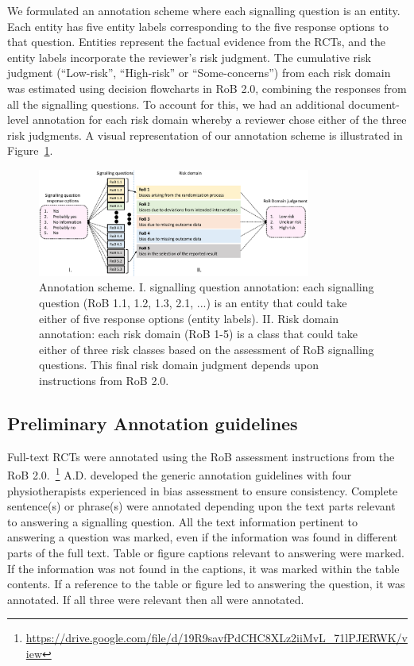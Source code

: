 \documentclass{IOS-Book-Article}
\begin{document}
We formulated an annotation scheme where each signalling question is an entity.
Each entity has five entity labels corresponding to the five response options to that question.
Entities represent the factual evidence from the RCTs, and the entity labels incorporate the reviewer's risk judgment.
The cumulative risk judgment (``Low-risk'', ``High-risk'' or ``Some-concerns'') from each risk domain was estimated using decision flowcharts in RoB 2.0, combining the responses from all the signalling questions.
To account for this, we had an additional document-level annotation for each risk domain whereby a reviewer chose either of the three risk judgments.
A visual representation of our annotation scheme is illustrated in Figure~\ref{fig:ann_scheme}.
%
\begin{figure}[!htbp]
    \centering
    \includegraphics[width=0.80\textwidth]{Figures/annotation_scheme.pdf}
    \caption{Annotation scheme. I. signalling question annotation: each signalling question (RoB 1.1, 1.2, 1.3, 2.1, ...) is an entity that could take either of five response options (entity labels). II. Risk domain annotation: each risk domain (RoB 1-5) is a class that could take either of three risk classes based on the assessment of RoB signalling questions. This final risk domain judgment depends upon instructions from RoB 2.0.}
    \label{fig:ann_scheme}
\end{figure}
%
%
%
\subsection{Preliminary Annotation guidelines}
\label{subsec:annot_guide}
%
Full-text RCTs were annotated using the RoB assessment instructions from the RoB 2.0.~\footnote{\url{https://drive.google.com/file/d/19R9savfPdCHC8XLz2iiMvL_71lPJERWK/view}}
A.D. developed the generic annotation guidelines with four physiotherapists experienced in bias assessment to ensure consistency.
Complete sentence(s) or phrase(s) were annotated depending upon the text parts relevant to answering a signalling question.
All the text information pertinent to answering a question was marked, even if the information was found in different parts of the full text.
Table or figure captions relevant to answering were marked.
If the information was not found in the captions, it was marked within the table contents.
If a reference to the table or figure led to answering the question, it was annotated.
If all three were relevant then all were annotated.
%
\end{document}
